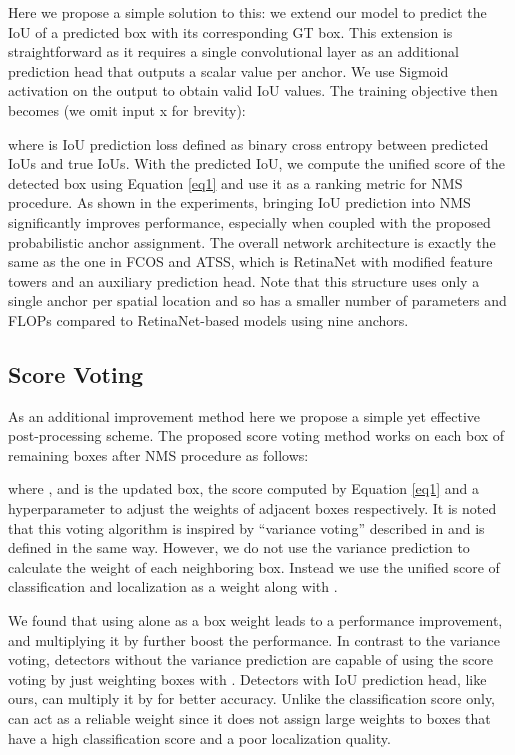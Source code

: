 \documentclass[runningheads]{llncs}
\begin{document}
Here we propose a simple solution to this: we extend our model to predict the IoU of a predicted box with its corresponding GT box. This extension is straightforward as it requires a single convolutional layer as an additional prediction head that outputs a scalar value per anchor. We use Sigmoid activation on the output to obtain valid IoU values. The training objective then becomes (we omit input x for brevity):

where  is IoU prediction loss defined as binary cross entropy between predicted IoUs and true IoUs. With the predicted IoU, we compute the unified score of the detected box using Equation \ref{eq1} and use it as a ranking metric for NMS procedure. As shown in the experiments, bringing IoU prediction into NMS significantly improves performance, especially when coupled with the proposed probabilistic anchor assignment. The overall network architecture is exactly the same as the one in FCOS\cite{fcos} and ATSS\cite{atss}, which is RetinaNet with modified feature towers and an auxiliary prediction head. Note that this structure uses only a single anchor per spatial location and so has a smaller number of parameters and FLOPs compared to RetinaNet-based models using nine anchors.

\subsection{Score Voting}
As an additional improvement method here we propose a simple yet effective post-processing scheme. The proposed score voting method works on each box  of remaining boxes after NMS procedure as follows:


where ,  and  is the updated box, the score computed by Equation \ref{eq1} and a hyperparameter to adjust the weights of adjacent boxes  respectively. It is noted that this voting algorithm is inspired by ``variance voting'' described in \cite{varvoting} and  is defined in the same way. However, we do not use the variance prediction to calculate the weight of each neighboring box. Instead we use the unified score of classification and localization  as a weight along with .

We found that using  alone as a box weight leads to a performance improvement, and multiplying it by  further boost the performance. In contrast to the variance voting, detectors without the variance prediction are capable of using the score voting by just weighting boxes with . Detectors with IoU prediction head, like ours, can multiply it by  for better accuracy. Unlike the classification score only,  can act as a reliable weight since it does not assign large weights to boxes that have a high classification score and a poor localization quality.
\end{document}

